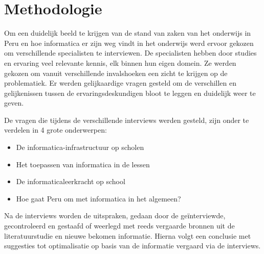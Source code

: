 
\chapter{Methodologie}
\label{ch:methodologie}


Om een duidelijk beeld te krijgen van de stand van zaken van het onderwijs in Peru en hoe informatica er zijn weg vindt in het onderwijs werd ervoor gekozen om verschillende specialisten te interviewen. De specialisten hebben door studies en ervaring veel relevante kennis, elk binnen hun eigen domein. Ze werden gekozen om vanuit verschillende invalshoeken een zicht te krijgen op de problematiek. Er werden gelijkaardige vragen gesteld om de verschillen en gelijkenissen tussen de ervaringsdeskundigen bloot te leggen en duidelijk weer te geven.

De vragen die tijdens de verschillende interviews werden gesteld, zijn onder te verdelen in 4 grote onderwerpen: 

\begin{itemize}
	\item De informatica-infrastructuur op scholen
	\item Het toepassen van informatica in de lessen
	\item De informaticaleerkracht op school
	\item Hoe gaat Peru om met informatica in het algemeen?
\end{itemize}

Na de interviews worden de uitspraken, gedaan door de geïnterviewde, gecontroleerd en gestaafd of weerlegd met reeds vergaarde bronnen uit de literatuurstudie en nieuwe bekomen informatie. Hierna volgt een conclusie met suggesties tot optimalisatie op basis van de informatie vergaard via de interviews.

